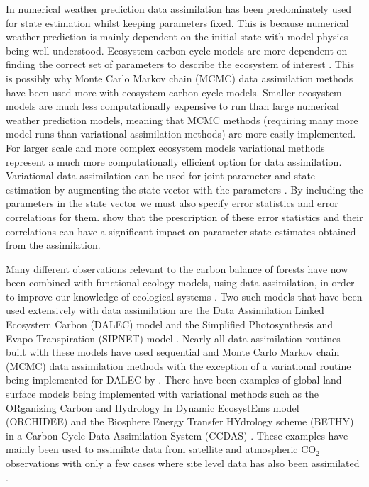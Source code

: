 \documentclass[review]{elsarticle}
\begin{document}
In numerical weather prediction data assimilation has been predominately used for state estimation whilst keeping parameters fixed. This is because numerical weather prediction is mainly dependent on the initial state with model physics being well understood. Ecosystem carbon cycle models are more dependent on finding the correct set of parameters to describe the ecosystem of interest \citep{luo2015predictability}. This is possibly why Monte Carlo Markov chain (MCMC) data assimilation methods have been used more with ecosystem carbon cycle models. Smaller ecosystem models are much less computationally expensive to run than large numerical weather prediction models, meaning that MCMC methods (requiring many more model runs than variational assimilation methods) are more easily implemented. For larger scale and more complex ecosystem models variational methods represent a much more computationally efficient option for data assimilation. Variational data assimilation can be used for joint parameter and state estimation by augmenting the state vector with the parameters \citep{navon1998practical}. By including the parameters in the state vector we must also specify error statistics and error correlations for them. \citet{smith2009variational} show that the prescription of these error statistics and their correlations can have a significant impact on parameter-state estimates obtained from the assimilation.

Many different observations relevant to the carbon balance of forests have now been combined with functional ecology models, using data assimilation, in order to improve our knowledge of ecological systems \citep{zobitz2011primer, fox2009reflex, richardson2010estimating, Quaife2008, Zobitz2014, Niu2014}. Two such models that have been used extensively with data assimilation are the Data Assimilation Linked Ecosystem Carbon (DALEC) model \citep{williams2005improved} and the Simplified Photosynthesis and Evapo-Transpiration (SIPNET) model \citep{braswell2005estimating}. Nearly all data assimilation routines built with these models have used sequential and Monte Carlo Markov chain (MCMC) data assimilation methods with the exception of a variational routine being implemented for DALEC by \citet{delahaies2013regularization}. There have been examples of global land surface models being implemented with variational methods such as the ORganizing Carbon and Hydrology In Dynamic EcosystEms model (ORCHIDEE) \citep{Krinner2005} and the Biosphere Energy Transfer HYdrology scheme (BETHY) in a Carbon Cycle Data Assimilation System (CCDAS) \citep{Kaminski2013}. These examples have mainly been used to assimilate data from satellite and atmospheric $\text{CO}_{2}$ observations with only a few cases where site level data has also been assimilated \citep{Verbeeck2011, Bacour2015}. 
\end{document}
